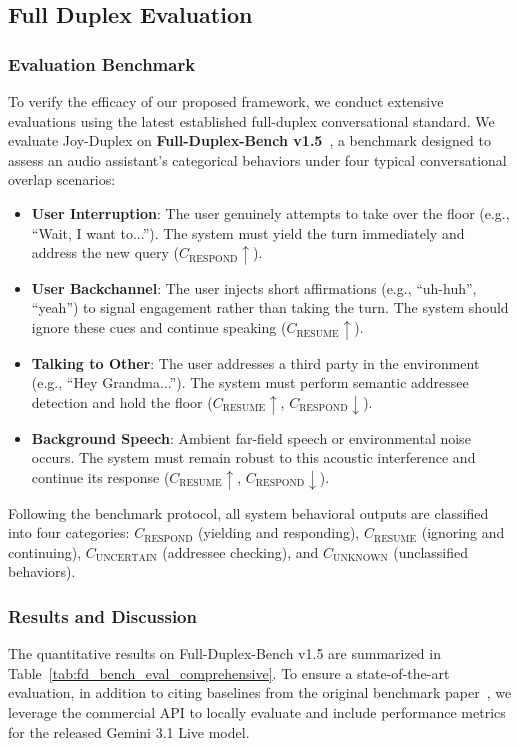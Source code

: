 \subsection{Full Duplex Evaluation}
\subsubsection{Evaluation Benchmark}
To verify the efficacy of our proposed framework, we conduct extensive evaluations using the latest established full-duplex conversational standard. We evaluate Joy-Duplex on \textbf{Full-Duplex-Bench v1.5}~\cite{lin2026fullduplexv1.5}, a benchmark designed to assess an audio assistant's categorical behaviors under four typical conversational overlap scenarios:
\begin{itemize}
    \item \textbf{User Interruption}: The user genuinely attempts to take over the floor (e.g., ``Wait, I want to...''). The system must yield the turn immediately and address the new query ($C_{\text{RESPOND}} \uparrow$).
    \item \textbf{User Backchannel}: The user injects short affirmations (e.g., ``uh-huh'', ``yeah'') to signal engagement rather than taking the turn. The system should ignore these cues and continue speaking ($C_{\text{RESUME}} \uparrow$).
    \item \textbf{Talking to Other}: The user addresses a third party in the environment (e.g., ``Hey Grandma...''). The system must perform semantic addressee detection and hold the floor ($C_{\text{RESUME}} \uparrow$, $C_{\text{RESPOND}} \downarrow$).
    \item \textbf{Background Speech}: Ambient far-field speech or environmental noise occurs. The system must remain robust to this acoustic interference and continue its response ($C_{\text{RESUME}} \uparrow$, $C_{\text{RESPOND}} \downarrow$).
\end{itemize}
Following the benchmark protocol, all system behavioral outputs are classified into four categories: $C_{\text{RESPOND}}$ (yielding and responding), $C_{\text{RESUME}}$ (ignoring and continuing), $C_{\text{UNCERTAIN}}$ (addressee checking), and $C_{\text{UNKNOWN}}$ (unclassified behaviors).

\subsubsection{Results and Discussion}
The quantitative results on Full-Duplex-Bench v1.5 are summarized in Table~\ref{tab:fd_bench_eval_comprehensive}. To ensure a state-of-the-art evaluation, in addition to citing baselines from the original benchmark paper~\cite{lin2026fullduplexv1.5}, we leverage the commercial API to locally evaluate and include performance metrics for the released Gemini 3.1 Live model.

